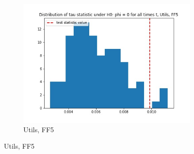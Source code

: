 \documentclass{article}
\begin{document}
\begin{figure}
\begin{subfigure}[b]{0.3\textwidth}
    \includegraphics[width=\textwidth]{Utils/tau_hist_02_FF5.jpg}
    \caption{Utils, FF5}
    \label{fig:2}
  \end{subfigure}
  \end{figure}
\end{document}
